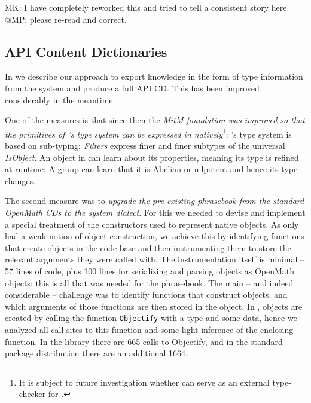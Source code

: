 \begin{newpart}{MK: I have completely reworked this and tried to tell a consistent story
    here. @MP: please re-read and correct.}
\subsection{\GAP API Content Dictionaries}

In \cite{DehKohKon:iop16} we describe our approach to export knowledge in the form of type
information from the \GAP system and produce a full \GAP API CD. This has been
improved considerably in the meantime. 

One of the measures is that since then the \emph{MitM foundation was improved so that the primitives of \GAP's type system can be
  expressed in \OMMT natively}\footnote{It is subject to future investigation whether
  \MMT can serve as an external type-checker for \GAP.}: \GAP's type system is based on
sub-typing: \emph{Filters} express finer and finer subtypes of the universal
\emph{IsObject}. An object in \GAP can learn about its properties, meaning its type is
refined at runtime: A group can learn that it is Abelian or nilpotent and hence its type
changes.

The second measure was to \emph{upgrade the pre-existing \GAP phrasebook from the standard
  OpenMath CDs to the \GAP system dialect}. For this we needed to devise and implement a
special treatment of the \GAP constructors used to represent native \GAP objects. As \GAP
only had a weak notion of object construction, we achieve this by identifying functions
that create objects in the \GAP code base and then instrumenting them to store the
relevant arguments they were called with.  The instrumentation itself is minimal -- 57
lines of \GAP code, plus 100 lines for serializing and parsing \GAP objects as OpenMath
objects: this is all that was needed for the phrasebook.  The main -- and indeed
considerable -- challenge was to identify functions that construct objects, and which
arguments of those functions are then stored in the object.  In \GAP, objects are created
by calling the function \lstinline|Objectify| with a type and some data, hence we analyzed
all call-sites to this function and some light inference of the enclosing function. In the
\GAP library there are 665 calls to Objectify, and in the standard package distribution
there are an additional 1664.


\end{newpart}
